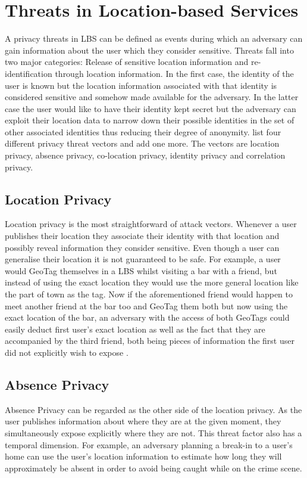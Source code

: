 \documentclass[english]{tktltiki2}
\theoremstyle{definition}
\theoremstyle{remark}
\begin{document}
\section{Threats in Location-based Services}

A privacy threats in LBS can be defined as events during which an adversary can gain information about the user which they consider sensitive\cite{LocationPrivacy}. Threats fall into two major categories: Release of sensitive location information and re-identification through location information. In the first case, the identity of the user is known but the location information associated with that identity is considered sensitive and somehow made available for the adversary. In the latter case the user would like to have their identity kept secret but the adversary can exploit their location data to narrow down their possible identities in the set of other associated identities thus reducing their degree of anonymity. \cite{LocationPrivacy} list four different privacy threat vectors and \cite{Ghinita2008} add one more. The vectors are location privacy, absence privacy, co-location privacy, identity privacy and correlation privacy.

\subsection{Location Privacy}
Location privacy is the most straightforward of attack vectors. Whenever a user publishes their location they associate their identity with that location and possibly reveal information they consider sensitive. Even though a user can generalise their location it is not guaranteed to be safe. For example, a user would GeoTag themselves in a LBS whilst visiting a bar with a friend, but instead of using the exact location they would use the more general location like the part of town as the tag. Now if the aforementioned friend would happen to meet another friend at the bar too and GeoTag them both but now using the exact location of the bar, an adversary with the access of both GeoTags could easily deduct first user's exact location as well as the fact that they are accompanied by the third friend, both being pieces of information the first user did not explicitly wish to expose \cite{LocationPrivacy}.

\subsection{Absence Privacy}
Absence Privacy can be regarded as the other side of the location privacy. As the user publishes information about where they are at the given moment, they simultaneously expose explicitly where they are not. This threat factor also has a temporal dimension. For example, an adversary planning a break-in to a user's home can use the user's location information to estimate how long they will approximately be absent in order to avoid being caught while on the crime scene.
\end{document}
